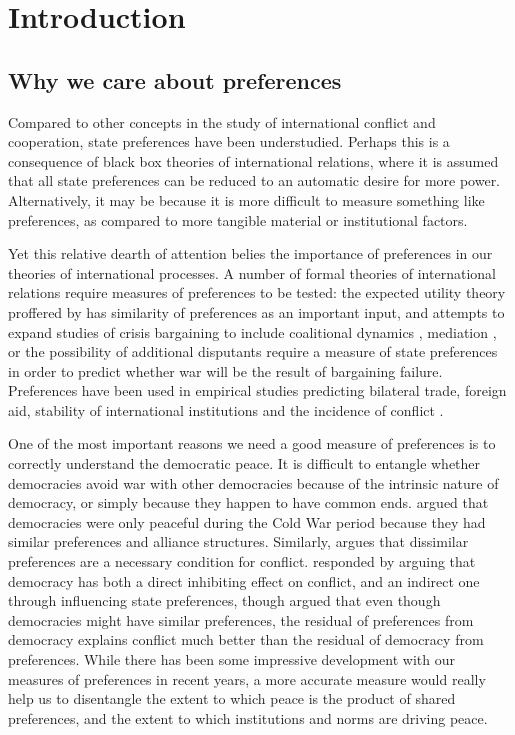 \setcounter{section}{1}

\section{Introduction}

\subsection{Why we care about preferences}

Compared to other concepts in the study of international conflict and cooperation, state preferences have been understudied. Perhaps this is a consequence of black box theories of international relations, where it is assumed that all state preferences can be reduced to an automatic desire for more power. Alternatively, it may be because it is more difficult to measure something like preferences, as compared to more tangible material or institutional factors.

Yet this relative dearth of attention belies the importance of preferences in our theories of international processes. A number of formal theories of international relations require measures of preferences to be tested: the expected utility theory proffered by \citep{buenodemesquita:1983} has similarity of preferences as an important input, and attempts to expand studies of crisis bargaining to include coalitional dynamics \citep{wolford:2014}, mediation \citep{kydd:2003}, or the possibility of additional disputants \citep{gallop:2017} require a measure of state preferences in order to predict whether war will be the result of bargaining failure. Preferences have been used in empirical studies predicting bilateral trade, foreign aid, stability of international institutions and the incidence of conflict \citep{kastner:2007, derouen:heo:2004, stone:2004, gartzke:2007, braumoeller:2008}. 

One of the most important reasons we need a good measure of preferences is to correctly understand the democratic peace. It is difficult to entangle whether democracies avoid war with other democracies because of the intrinsic nature of democracy, or simply because they happen to have common ends. \citet{farber:gowa:1995} argued that democracies were only peaceful during the Cold War period because they had similar preferences and alliance structures. Similarly, \citet{gartzke:1998} argues that dissimilar preferences are a necessary condition for conflict. \citet{oneal:russett:1999e} responded by arguing that democracy has both a direct inhibiting effect on conflict, and an indirect one through influencing state preferences, though \citet{gartzke:2000} argued that even though democracies might have similar preferences, the residual of preferences from democracy explains conflict much better than the residual of democracy from preferences. While there has been some impressive development with our measures of preferences in recent years, a more accurate measure would really help us to disentangle the extent to which peace is the product of shared preferences, and the extent to which institutions and norms are driving peace.

